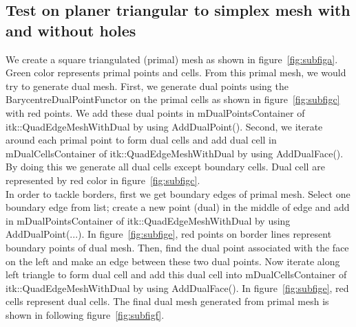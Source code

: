 \documentclass{InsightArticle}
\begin{document}
\subsection{Test on planer triangular to simplex mesh with and without holes}
We create a square triangulated (primal) mesh as shown in figure~\ref{fig:subfiga}. Green color represents primal points and cells. From this primal mesh, we would try to generate dual mesh. First, we generate dual points using the BarycentreDualPointFunctor on the primal cells as shown in figure~\ref{fig:subfigc} with red points. We add these dual points in mDualPointsContainer of itk::QuadEdgeMeshWithDual by using AddDualPoint(). Second, we iterate around each primal point to form dual cells and add dual cell in mDualCellsContainer of itk::QuadEdgeMeshWithDual by using AddDualFace(). By doing this we generate all dual cells except boundary cells. Dual cell are represented by red color in figure~\ref{fig:subfigc}.\\
In order to tackle borders, first we get boundary edges of primal mesh. Select one boundary edge from list; create a new point (dual) in the middle of edge and add in mDualPointsContainer of itk::QuadEdgeMeshWithDual by using AddDualPoint(...).  
In figure~\ref{fig:subfige}, red points on border lines represent boundary points of dual mesh. Then, find the dual point associated with the face on the left and make an edge between these two dual points. Now iterate along left triangle to form dual cell and add this dual cell into mDualCellsContainer of itk::QuadEdgeMeshWithDual by using AddDualFace(). In figure~\ref{fig:subfige}, red cells represent dual cells. The final dual mesh generated from primal mesh is shown in following figure~\ref{fig:subfigf}. 
\end{document}
